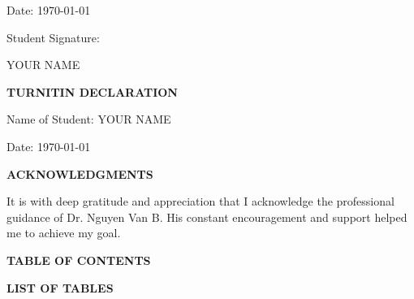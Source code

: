 \begin{flushright}
    Date: \today

    Student Signature:


    YOUR NAME
\end{flushright}


\newpage
\begin{center}
    \fontsize{14}{16}\selectfont
    \textbf{TURNITIN DECLARATION}
\end{center}
\vspace{0.5cm}
\doublespacing
\justifying

\noindent Name of Student: YOUR NAME

\noindent Date: \today


\newpage
\begin{center}
    \fontsize{14}{16}\selectfont
    \textbf{ACKNOWLEDGMENTS}
\end{center}
\vspace{0.5cm}
\doublespacing
\justifying

It is with deep gratitude and appreciation that I acknowledge the professional guidance of Dr. Nguyen Van B. 
His constant encouragement and support helped me to achieve my goal. 

\vfill


\newpage
\begin{center}
    \fontsize{14}{16}\selectfont
    \textbf{TABLE OF CONTENTS}
\end{center}
\vspace{0.5cm}
\singlespacing %

\makeatletter
{}  %
\makeatother

\newpage
\doublespacing %


\newpage
\begin{center}
    \fontsize{14}{16}\selectfont
    \textbf{LIST OF TABLES}
\end{center}
\vspace{0.5cm}
\singlespacing %

